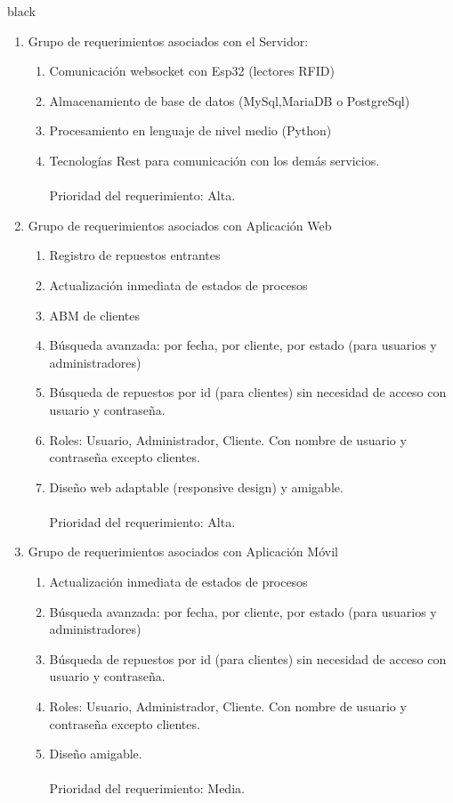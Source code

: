 \documentclass[11pt]{charter}
\begin{document}
\begin{consigna}{black}

\begin{enumerate}
\item Grupo de requerimientos asociados con el Servidor:
	\begin{enumerate}
	\item Comunicación websocket con Esp32 (lectores RFID)
	\item Almacenamiento de base de datos (MySql,MariaDB o PostgreSql)
	\item Procesamiento en lenguaje de nivel medio (Python)
	\item Tecnologías Rest para comunicación con los demás servicios.
	\\\\ Prioridad del requerimiento: Alta.
	\end{enumerate}
\item Grupo de requerimientos asociados con Aplicación Web
	\begin{enumerate}
	\item Registro de repuestos entrantes
	\item Actualización inmediata de estados de procesos
	\item ABM de clientes
	\item Búsqueda avanzada: por fecha, por cliente, por estado (para usuarios y administradores)
	\item Búsqueda de repuestos por id (para clientes) sin necesidad de acceso con usuario y contraseña.
	\item Roles: Usuario, Administrador, Cliente. Con nombre de usuario y contraseña excepto clientes.
	\item Diseño web adaptable (responsive design) y amigable.
	\\\\ Prioridad del requerimiento: Alta.
	\end{enumerate}
\item Grupo de requerimientos asociados con Aplicación Móvil
	\begin{enumerate}
	\item Actualización inmediata de estados de procesos
	\item Búsqueda avanzada: por fecha, por cliente, por estado (para usuarios y administradores)
	\item Búsqueda de repuestos por id (para clientes) sin necesidad de acceso con usuario y contraseña.
	\item Roles: Usuario, Administrador, Cliente. Con nombre de usuario y contraseña excepto clientes.
	\item Diseño amigable.
	\\\\ Prioridad del requerimiento: Media.
	\end{enumerate}
\end{enumerate}


\end{consigna}
\end{document}
